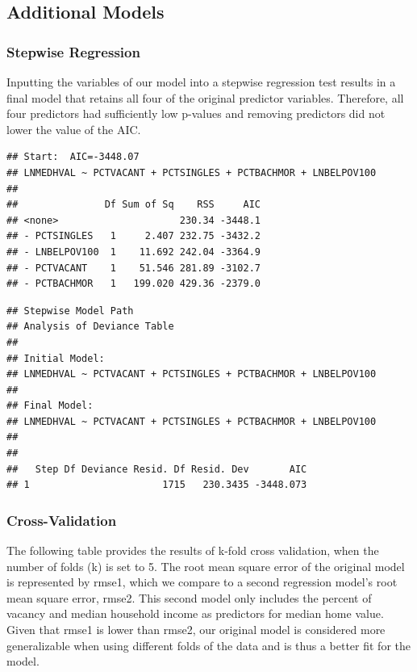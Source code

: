 \documentclass[
]{article}
\begin{document}
\hypertarget{additional-models}{%
\subsection{Additional Models}\label{additional-models}}

\hypertarget{stepwise-regression-1}{%
\subsubsection{Stepwise Regression}\label{stepwise-regression-1}}

Inputting the variables of our model into a stepwise regression test
results in a final model that retains all four of the original predictor
variables. Therefore, all four predictors had sufficiently low p-values
and removing predictors did not lower the value of the AIC.

\begin{verbatim}
## Start:  AIC=-3448.07
## LNMEDHVAL ~ PCTVACANT + PCTSINGLES + PCTBACHMOR + LNBELPOV100
## 
##               Df Sum of Sq    RSS     AIC
## <none>                     230.34 -3448.1
## - PCTSINGLES   1     2.407 232.75 -3432.2
## - LNBELPOV100  1    11.692 242.04 -3364.9
## - PCTVACANT    1    51.546 281.89 -3102.7
## - PCTBACHMOR   1   199.020 429.36 -2379.0
\end{verbatim}

\begin{verbatim}
## Stepwise Model Path 
## Analysis of Deviance Table
## 
## Initial Model:
## LNMEDHVAL ~ PCTVACANT + PCTSINGLES + PCTBACHMOR + LNBELPOV100
## 
## Final Model:
## LNMEDHVAL ~ PCTVACANT + PCTSINGLES + PCTBACHMOR + LNBELPOV100
## 
## 
##   Step Df Deviance Resid. Df Resid. Dev       AIC
## 1                       1715   230.3435 -3448.073
\end{verbatim}

\hypertarget{cross-validation}{%
\subsubsection{Cross-Validation}\label{cross-validation}}

The following table provides the results of k-fold cross validation,
when the number of folds (k) is set to 5. The root mean square error of
the original model is represented by rmse1, which we compare to a second
regression model's root mean square error, rmse2. This second model only
includes the percent of vacancy and median household income as
predictors for median home value. Given that rmse1 is lower than rmse2,
our original model is considered more generalizable when using different
folds of the data and is thus a better fit for the model.
\end{document}
